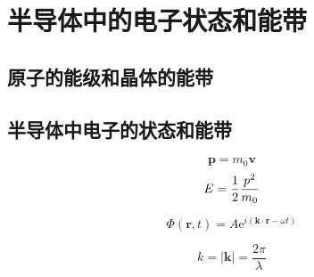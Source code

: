 \section{半导体中的电子状态和能带}

\subsection{原子的能级和晶体的能带}

\subsection{半导体中电子的状态和能带}

\begin{equation}
    \boldsymbol{p} = m_0\boldsymbol{v}
\end{equation}
\begin{equation}
    E = {1 \over 2}\frac{p^2}{m_0}
\end{equation}

\begin{equation}
    \varPhi(\boldsymbol{r}, t)
    = A\mathrm{e}^{i(\boldsymbol{k}\cdot\boldsymbol{r} - \omega{t})}
\end{equation}

\begin{equation}
    k = |\boldsymbol{k}| = \frac{2\pi}{\lambda}
\end{equation}

